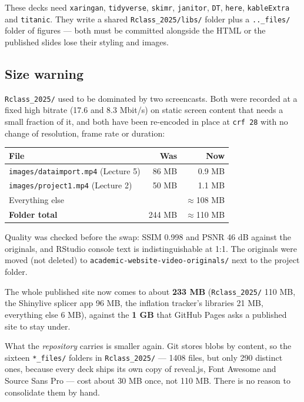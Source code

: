 \documentclass[11pt,a4paper]{article}
\newcommand{\file}[1]{\texttt{#1}}
\begin{document}
These decks need \texttt{xaringan}, \texttt{tidyverse}, \texttt{skimr},
\texttt{janitor}, \texttt{DT}, \texttt{here}, \texttt{kableExtra} and
\texttt{titanic}. They write a shared \file{Rclass\_2025/libs/} folder plus a
\file{..\_files/} folder of figures --- both must be committed alongside the
HTML or the published slides lose their styling and images.

\subsection{Size warning}\label{sec:size}

\file{Rclass\_2025/} used to be dominated by two screencasts. Both were
recorded at a fixed high bitrate (17.6 and 8.3 Mbit/s) on static screen
content that needs a small fraction of it, and both have been re-encoded
in place at \texttt{crf 28} with no change of resolution, frame rate or
duration:

\begin{center}
\begin{tabular}{@{}lrr@{}}
\toprule
\textbf{File} & \textbf{Was} & \textbf{Now} \\
\midrule
\file{images/dataimport.mp4} (Lecture 5) & 86 MB & 0.9 MB \\
\file{images/project1.mp4} (Lecture 2)   & 50 MB & 1.1 MB \\
Everything else                          & \multicolumn{2}{r}{$\approx$108 MB} \\
\midrule
\textbf{Folder total}                    & 244 MB & $\approx$110 MB \\
\bottomrule
\end{tabular}
\end{center}

Quality was checked before the swap: SSIM 0.998 and PSNR 46 dB against the
originals, and RStudio console text is indistinguishable at 1:1. The
originals were moved (not deleted) to
\file{academic-website-video-originals/} next to the project folder.

The whole published site now comes to about \textbf{233 MB}
(\file{Rclass\_2025/} 110 MB, the Shinylive splicer app 96 MB, the
inflation tracker's libraries 21 MB, everything else 6 MB), against the
\textbf{1 GB} that GitHub Pages asks a published site to stay under.

What the \emph{repository} carries is smaller again. Git stores blobs by
content, so the sixteen \file{*\_files/} folders in \file{Rclass\_2025/} ---
1408 files, but only 290 distinct ones, because every deck ships its own
copy of reveal.js, Font Awesome and Source Sans Pro --- cost about 30 MB
once, not 110 MB. There is no reason to consolidate them by hand.
\end{document}
